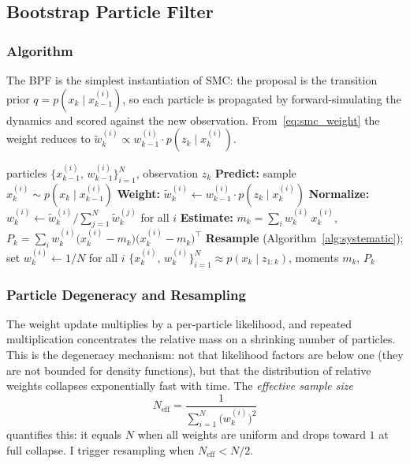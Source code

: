 \documentclass{article}
\begin{document}
\subsection{Bootstrap Particle Filter}

\subsubsection{Algorithm}

The BPF is the simplest instantiation of SMC: the proposal is the transition prior $q = p(x_k \mid x_{k-1}^{(i)})$, so each particle is propagated by forward-simulating the dynamics and scored against the new observation. From~\eqref{eq:smc_weight} the weight reduces to $\tilde{w}_k^{(i)} \propto w_{k-1}^{(i)} \cdot p(z_k \mid x_k^{(i)})$.

\begin{algorithm}[H]
\caption{Bootstrap Particle Filter (BPF)}
\label{alg:bpf}
\begin{algorithmic}[1]
\REQUIRE particles $\{x_{k-1}^{(i)},\, w_{k-1}^{(i)}\}_{i=1}^N$, observation $z_k$
    \STATE \textbf{Predict:} sample $x_k^{(i)} \sim p(x_k \mid x_{k-1}^{(i)})$
    \STATE \textbf{Weight:} $\tilde{w}_k^{(i)} \leftarrow w_{k-1}^{(i)} \cdot p(z_k \mid x_k^{(i)})$
\ENDFOR
\STATE \textbf{Normalize:} $w_k^{(i)} \leftarrow \tilde{w}_k^{(i)} \big/ \sum_{j=1}^N \tilde{w}_k^{(j)}$ for all $i$
\STATE \textbf{Estimate:} $m_k = \sum_i w_k^{(i)}\, x_k^{(i)}$, \quad $P_k = \sum_i w_k^{(i)}\bigl(x_k^{(i)}-m_k\bigr)\bigl(x_k^{(i)}-m_k\bigr)^\top$
    \STATE \textbf{Resample} (Algorithm~\ref{alg:systematic}); set $w_k^{(i)} \leftarrow 1/N$ for all $i$
\ENDIF
\ENSURE $\{x_k^{(i)},\, w_k^{(i)}\}_{i=1}^N \approx p(x_k \mid z_{1:k})$, moments $m_k$, $P_k$
\end{algorithmic}
\end{algorithm}

\subsubsection{Particle Degeneracy and Resampling}

The weight update multiplies by a per-particle likelihood, and repeated multiplication concentrates the relative mass on a shrinking number of particles. This is the degeneracy mechanism: not that likelihood factors are below one (they are not bounded for density functions), but that the distribution of relative weights collapses exponentially fast with time. The \textit{effective sample size}
\begin{equation}
    N_{\mathrm{eff}} = \frac{1}{\displaystyle\sum_{i=1}^N \bigl(w_k^{(i)}\bigr)^2}
\end{equation}
quantifies this: it equals $N$ when all weights are uniform and drops toward $1$ at full collapse. I trigger resampling when $N_{\mathrm{eff}} < N/2$.
\end{document}

